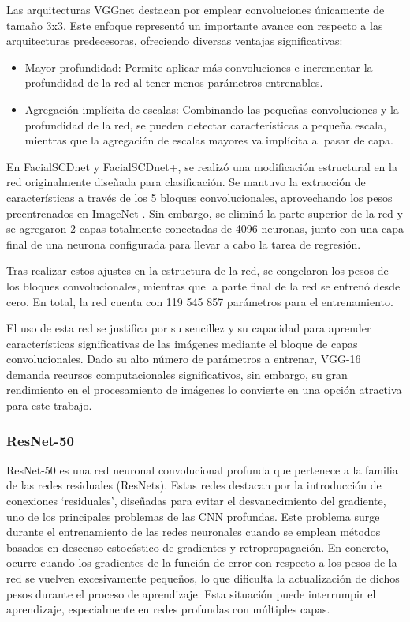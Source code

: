 Las arquitecturas VGGnet destacan por emplear convoluciones únicamente de tamaño 3x3. Este enfoque representó un importante avance con respecto a las arquitecturas predecesoras, ofreciendo diversas ventajas significativas:

\begin{itemize}
	\item Mayor profundidad: Permite aplicar más convoluciones e incrementar la profundidad de la red al tener menos parámetros entrenables.
	\item Agregación implícita de escalas: Combinando las pequeñas convoluciones y la profundidad de la red, se pueden detectar características a pequeña escala, mientras que la agregación de escalas mayores va implícita al pasar de capa.
\end{itemize}

En FacialSCDnet y FacialSCDnet+, se realizó una modificación estructural en la red originalmente diseñada para clasificación. Se mantuvo la extracción de características a través de los 5 bloques convolucionales, aprovechando los pesos preentrenados en ImageNet \cite{97}. Sin embargo, se eliminó la parte superior de la red y se agregaron 2 capas totalmente conectadas de 4096 neuronas, junto con una capa final de una neurona configurada para llevar a cabo la tarea de regresión.

Tras realizar estos ajustes en la estructura de la red, se congelaron los pesos de los bloques convolucionales, mientras que la parte final de la red se entrenó desde cero. En total, la red cuenta con 119 545 857 parámetros para el entrenamiento.

El uso de esta red se justifica por su sencillez y su capacidad para aprender características significativas de las imágenes mediante el bloque de capas convolucionales. Dado su alto número de parámetros a entrenar, VGG-16 demanda recursos computacionales significativos, sin embargo, su gran rendimiento en el procesamiento de imágenes lo convierte en una opción atractiva para este trabajo.

\subsubsection{ResNet-50}

ResNet-50 es una red neuronal convolucional profunda que pertenece a la familia de las redes residuales \cite{72} (ResNets). Estas redes destacan por la introducción de conexiones \enquote*{residuales}, diseñadas para evitar el desvanecimiento del gradiente, uno de los principales problemas de las CNN profundas.
Este problema surge durante el entrenamiento de las redes neuronales cuando se emplean métodos basados en descenso estocástico de gradientes y retropropagación. En concreto, ocurre cuando los gradientes de la función de error con respecto a los pesos de la red se vuelven excesivamente pequeños, lo que dificulta la actualización de dichos pesos durante el proceso de aprendizaje. Esta situación puede interrumpir el aprendizaje, especialmente en redes profundas con múltiples capas.

